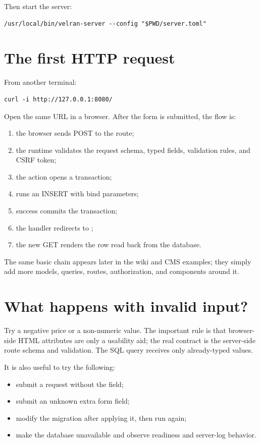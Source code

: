 Then start the server:

\begin{lstlisting}
/usr/local/bin/velran-server --config "$PWD/server.toml"
\end{lstlisting}

\section{The first HTTP request}

From another terminal:

\begin{lstlisting}
curl -i http://127.0.0.1:8080/
\end{lstlisting}

Open the same URL in a browser. After the form is submitted, the flow is:

\begin{enumerate}
  \item the browser sends POST to the  route;
  \item the runtime validates the request schema, typed fields, validation rules, and CSRF token;
  \item the  action opens a transaction;
  \item {} runs an INSERT with bind parameters;
  \item success commits the transaction;
  \item the handler redirects to \code{/};
  \item the new GET renders the row read back from the database.
\end{enumerate}

The same basic chain appears later in the wiki and CMS examples; they simply add more models, queries, routes, authorization, and components around it.

\section{What happens with invalid input?}

Try a negative price or a non-numeric value. The important rule is that browser-side HTML attributes are only a usability aid; the real contract is the server-side route schema and validation. The SQL query receives only already-typed values.

It is also useful to try the following:

\begin{itemize}
  \item submit a request without the  field;
  \item submit an unknown extra form field;
  \item modify the migration after applying it, then run  again;
  \item make the database unavailable and observe readiness and server-log behavior.
\end{itemize}

